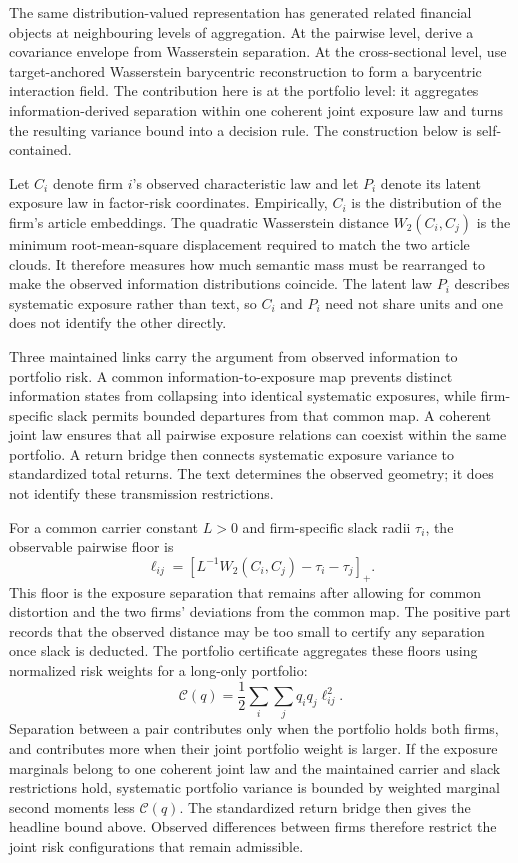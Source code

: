 The same distribution-valued representation has generated related
financial objects at neighbouring levels of aggregation.
At the pairwise level, \citet{gawronsky_continuous_2026} derive a
covariance envelope from Wasserstein separation.
At the cross-sectional level, \citet{gawronsky_spatial_2027} use
target-anchored Wasserstein barycentric reconstruction to form a
barycentric interaction field.
The contribution here is at the portfolio level: it aggregates
information-derived separation within one coherent joint exposure law
and turns the resulting variance bound into a decision rule.
The construction below is self-contained.

Let $C_i$ denote firm $i$'s observed characteristic law and let $P_i$
denote its latent exposure law in factor-risk coordinates.
Empirically, $C_i$ is the distribution of the firm's article embeddings.
The quadratic Wasserstein distance $W_2(C_i,C_j)$ is the minimum
root-mean-square displacement required to match the two article clouds.
It therefore measures how much semantic mass must be rearranged to
make the observed information distributions coincide.
The latent law $P_i$ describes systematic exposure rather than text,
so $C_i$ and $P_i$ need not share units and one does not identify the
other directly.

Three maintained links carry the argument from observed information
to portfolio risk.
A common information-to-exposure map prevents distinct information
states from collapsing into identical systematic exposures, while
firm-specific slack permits bounded departures from that common map.
A coherent joint law ensures that all pairwise exposure relations can
coexist within the same portfolio.
A return bridge then connects systematic exposure variance to
standardized total returns.
The text determines the observed geometry; it does not identify these
transmission restrictions.

For a common carrier constant $L>0$ and firm-specific slack radii
$\tau_i$, the observable pairwise floor is
\[
  \ell_{ij}
  =\left[L^{-1}W_2(C_i,C_j)-\tau_i-\tau_j\right]_+.
\]
This floor is the exposure separation that remains after allowing for
common distortion and the two firms' deviations from the common map.
The positive part records that the observed distance may be too small
to certify any separation once slack is deducted.
The portfolio certificate aggregates these floors using normalized
risk weights for a long-only portfolio:
\[
  \mathcal C(q)
  =\frac12\sum_i \sum_j q_i q_j\ell_{ij}^2.
\]
Separation between a pair contributes only when the portfolio holds
both firms, and contributes more when their joint portfolio weight is larger.
If the exposure marginals belong to one coherent joint law and the
maintained carrier and slack restrictions hold, systematic portfolio
variance is bounded by weighted marginal second moments less $\mathcal C(q)$.
The standardized return bridge then gives the headline bound above.
Observed differences between firms therefore restrict the joint risk
configurations that remain admissible.

